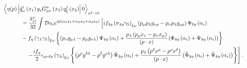 \begin{equation}
    \begin{aligned}
         \left\langle\eta(p)\left|\bar{q}_\omega^i\left(x_1\right) g_s G_{\mu \nu}^a\left(x_3\right) q_{\xi}^j\left(x_2\right)\right| 0\right\rangle_{x^2 \rightarrow 0}                                                                                                                                                                                                                                                       \\
         & \hspace{-5cm} =  \frac{\lambda_{j i}^a}{32} \int \mathcal{D} \alpha_i e^{i p\left(\alpha_1 x_1+\alpha_2 x_2+\alpha_3 x_3\right)}\left[i f_{3 \eta}\left(\sigma_{\lambda \rho} \gamma_5\right)_{\xi \omega}\left(p_\mu p_\lambda g_{\nu \rho}-p_\nu p_\lambda g_{\mu \rho}\right) \Phi_{3 \eta}\left(\alpha_i\right)\right.                                                                                                         \\
         & \hspace{-5cm} -f_\eta\left(\gamma_\lambda \gamma_5\right)_{\xi \omega}\left\{\left(p_\nu g_{\mu \lambda}-p_\mu g_{\nu \lambda}\right) \Psi_{4 \eta}\left(\alpha_i\right)+\frac{p_\lambda\left(p_\mu x_\nu-p_\nu x_\mu\right)}{(p \cdot x)}\left(\Phi_{4 \eta}\left(\alpha_i\right)+\Psi_{4 \eta}\left(\alpha_i\right)\right)\right\}                                                                                               \\
         & \hspace{-5cm} \left.\quad-\frac{i f_\eta}{2} \epsilon_{\mu \nu \delta \rho}\left(\gamma_\lambda\right)_{\xi \omega}\left\{\left(p^\rho g^{\delta \lambda}-p^\delta g^{\rho \lambda}\right) \tilde{\Psi}_{4 \eta}\left(\alpha_i\right)+\frac{p_\lambda\left(p^\delta x^\rho-p^\rho x^\delta\right)}{(p \cdot x)}\left(\tilde{\Phi}_{4 \eta}\left(\alpha_i\right)+\tilde{\Psi}_{4 \eta}\left(\alpha_i\right)\right)\right\}\right] .
    \end{aligned}
    \label{eq:DA_02}
\end{equation}





















